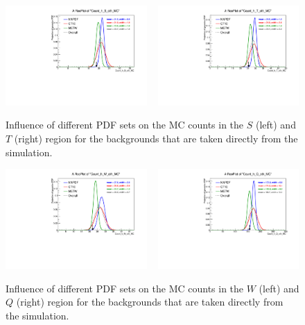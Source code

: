 \begin{figure}[htpb]
\centering
\includegraphics[width=0.48\textwidth,clip=true,trim=0 0.2cm 0 1.2cm]
{figures/razor_systematics/h_S_oth_MC}
~
\includegraphics[width=0.48\textwidth,clip=true,trim=0 0.2cm 0 1.2cm]
{figures/razor_systematics/h_T_oth_MC}
\caption{Influence of different PDF sets on the MC counts in the $S$ (left) and $T$ (right) region
for the backgrounds that are taken directly from the simulation.
\label{fig:PDF_effect_on_bg_oth1}}
\end{figure}

\begin{figure}[htpb]
\centering
\includegraphics[width=0.48\textwidth,clip=true,trim=0 0.2cm 0 1.2cm]
{figures/razor_systematics/h_W_oth_MC}
~
\includegraphics[width=0.48\textwidth,clip=true,trim=0 0.2cm 0 1.2cm]
{figures/razor_systematics/h_Q_oth_MC}
\caption{Influence of different PDF sets on the MC counts in the $W$ (left) and $Q$ (right) region
for the backgrounds that are taken directly from the simulation.
\label{fig:PDF_effect_on_bg_oth2}}
\end{figure}

